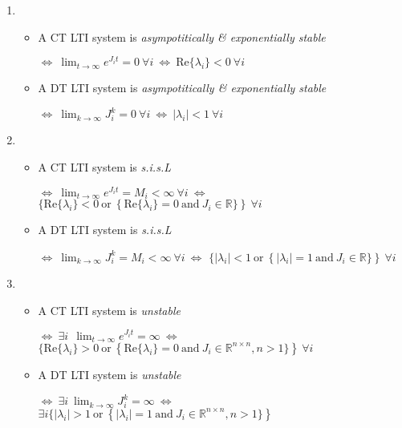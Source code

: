 \documentclass[twoside]{article}
\begin{document}
\begin{enumerate}
\item 
\begin{itemize}
\item A CT LTI system is \textit{asympotitically \& exponentially stable} 

$\iff \ \lim_{t \to \infty } e^{J_i t} = 0 \ \forall i \ \iff \ \mathrm{Re}\lbrace \lambda_i \rbrace < 0 \ \forall i$  
\item A DT LTI system is \textit{asympotitically \& exponentially stable} 

$\iff \ \lim_{k \to \infty } J_i^k = 0 \ \forall i \ \iff \ | \lambda_i | < 1 \ \forall i$  
\end{itemize}
%
\item 
\begin{itemize}
\item A CT LTI system is \textit{s.i.s.L} 

$\iff \ \lim_{t \to \infty } e^{J_i t} = M_i < \infty \ \forall i \ \iff $ 
$ \lbrace \mathrm{Re}\lbrace \lambda_i \rbrace < 0 \ \mathrm{or} \ \left\lbrace \mathrm{Re}\lbrace \lambda_i \rbrace = 0 \ \mathrm{and} \ J_i \in \mathbb{R} \rbrace \right\rbrace \ \forall i$  
%
\item A DT LTI system is \textit{s.i.s.L} 

$\iff \ \lim_{k \to \infty } J_i^k = M_i < \infty \ \forall i \ \iff $ 
$ \lbrace | \lambda_i | < 1 \ \mathrm{or} \ \left\lbrace | \lambda_i | = 1 \ \mathrm{and} \ J_i \in \mathbb{R} \rbrace \right\rbrace \ \forall i$  
\end{itemize}

\item 
\begin{itemize}
\item A CT LTI system is \textit{unstable}

$\iff \ \exists i \ \ \lim_{t \to \infty } e^{J_i t} = \infty \ \iff $ 
$ \lbrace \mathrm{Re}\lbrace \lambda_i \rbrace > 0 \ \mathrm{or} \ \left\lbrace \mathrm{Re}\lbrace \lambda_i \rbrace = 0 \ \mathrm{and} \ J_i \in \mathbb{R}^{n \times n} , n>1 \rbrace \right\rbrace \ \forall i$  
%
\item A DT LTI system is \textit{unstable} 

$\iff \ \exists i \ \lim_{k \to \infty } J_i^k = \infty \ \iff $ 
$ \exists i \lbrace | \lambda_i | > 1 \ \mathrm{or} \ \left\lbrace | \lambda_i | = 1 \ \mathrm{and} \ J_i \in \mathbb{R}^{n \times n} , n>1 \rbrace \right\rbrace $  
\end{itemize}

\end{enumerate}
\end{document}
